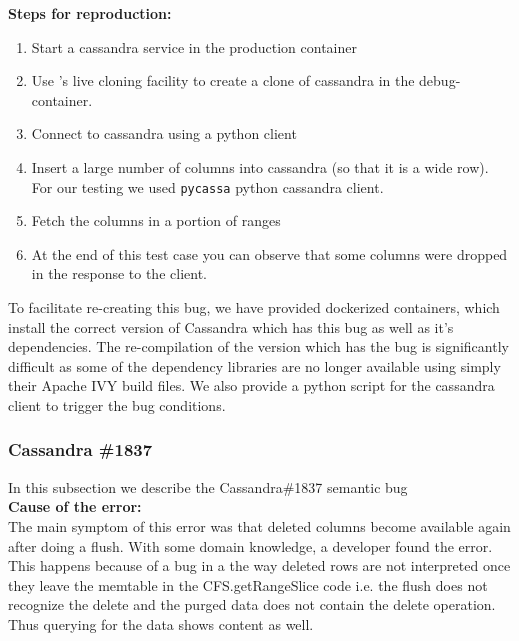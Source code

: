 \noindent \textbf{Steps for reproduction:} \\

\begin{adjustwidth}{0.5cm}{}
	\begin{enumerate}
		\item Start a cassandra service in the production container
		\item Use \parikshan's live cloning facility to create a clone of cassandra in the debug-container.
		\item Connect to cassandra using a python client
		\item Insert a large number of columns into cassandra (so that it is a wide row). For our testing we used \texttt{pycassa} python cassandra client. 
		\item Fetch the columns in a portion of ranges
		\item At the end of this test case you can observe that some columns were dropped in the response to the client.
	\end{enumerate}

\end{adjustwidth}

To facilitate re-creating this bug, we have provided dockerized containers, which install the correct version of Cassandra which has this bug as well as it's dependencies. The re-compilation of the version which has the bug is significantly difficult as some of the dependency libraries are no longer available using simply their Apache IVY build files. We also provide a python script for the cassandra client to trigger the bug conditions.

\subsubsection{Cassandra \#1837}

In this subsection we describe the Cassandra\#1837 semantic bug \\

\noindent \textbf{Cause of the error:} \\

The main symptom of this error was that deleted columns become available again after doing a flush.
With some domain knowledge, a developer found the error. 
This happens because of a bug in a the way deleted rows are not interpreted once they leave the memtable in the CFS.getRangeSlice code i.e. the flush does not recognize the delete and the purged data does not contain the delete operation. 
Thus querying for the data shows  content as well.

